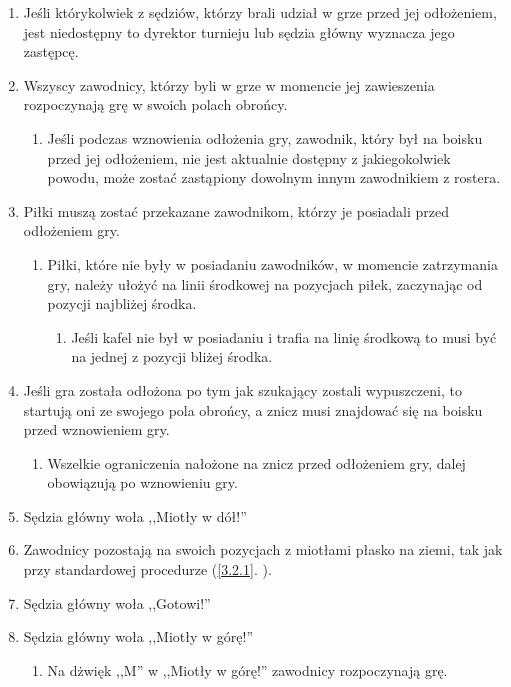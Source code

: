 \documentclass[11pt,a4paper]{article}
\renewcommand{\subsubsection}[1]{
  \oldsubsubsection{#1}%
  \label{\thesubsubsection}
}
\newcommand{\myref}[1]{\ref{#1}. \nameref{#1}}
\begin{document}
\subsubsection{Wznawianie odłożonej gry}
\begin{enumerate}
  \item Jeśli którykolwiek z sędziów, którzy brali udział w grze przed jej odłożeniem, jest niedostępny to dyrektor turnieju lub sędzia główny wyznacza jego zastępcę.
  \item Wszyscy zawodnicy, którzy byli w grze w momencie jej zawieszenia rozpoczynają grę w
  swoich polach obrońcy.
  \begin{enumerate}
    \item Jeśli podczas wznowienia odłożenia gry, zawodnik, który był na boisku przed jej odłożeniem, nie jest
    aktualnie dostępny z jakiegokolwiek powodu, może zostać zastąpiony dowolnym innym
    zawodnikiem z rostera.
  \end{enumerate}
  \item Piłki muszą zostać przekazane zawodnikom, którzy je posiadali przed odłożeniem gry.
  \begin{enumerate}
    \item Piłki, które nie były w posiadaniu zawodników, w momencie zatrzymania gry, należy ułożyć na linii środkowej na pozycjach piłek, zaczynając od pozycji najbliżej środka.
    \begin{enumerate}
      \item Jeśli kafel nie był w posiadaniu i trafia na linię środkową to musi być na jednej z pozycji bliżej środka.
    \end{enumerate}
  \end{enumerate}
  \item Jeśli gra została odłożona po tym jak szukający zostali wypuszczeni, to startują oni ze swojego pola obrońcy, a znicz musi znajdować się na boisku przed wznowieniem gry.
  \begin{enumerate}
    \item Wszelkie ograniczenia nałożone na znicz przed odłożeniem gry, dalej obowiązują po wznowieniu gry.
  \end{enumerate}
  \item Sędzia główny woła ,,Miotły w dół!''
  \item Zawodnicy pozostają na swoich pozycjach z miotłami płasko na ziemi, tak jak przy standardowej procedurze (\myref{3.2.1}).
  \item Sędzia główny woła ,,Gotowi!''
  \item Sędzia główny woła ,,Miotły w górę!''
  \begin{enumerate}
    \item Na dżwięk ,,M'' w ,,Miotły w górę!'' zawodnicy rozpoczynają grę.
  \end{enumerate}
\end{enumerate}
\end{document}

